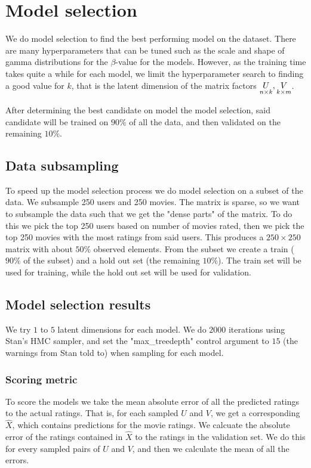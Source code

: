 \documentclass[12pt]{article}
\begin{document}
\section{Model selection}
We do model selection to find the best performing model on the dataset. There are many hyperparameters that can be tuned such as the scale and shape of gamma distributions for the $\beta$-value for the models. However, as the training time takes quite a while for each model, we limit the hyperparameter search to finding a good value for $k$, that is the latent dimension of the matrix factors $\underset{n \times k}{U}, \underset{k \times m}{V}$. 

After determining the best candidate on model the model selection, said candidate will be trained on $90\%$ of all the data, and then validated on the remaining $10\%$.

    \subsection{Data subsampling}
    To speed up the model selection process we do model selection on a subset of the data. We subsample 250 users and 250 movies. The matrix is sparse, so we want to subsample the data such that we get the "dense parts" of the matrix. To do this we pick the top 250 users based on number of movies rated, then we pick the top 250 movies with the most ratings from said users. This produces a $250 \times 250$ matrix with about $50\%$ observed elements. From the subset we create a train ($90\%$ of the subset) and a hold out set (the remaining $10\%$). The train set will be used for training, while the hold out set will be used for validation.

    \subsection{Model selection results}
    We try $1$ to $5$ latent dimensions for each model. We do $2000$ iterations using Stan's HMC sampler, and set the "max\_treedepth" control argument to $15$ (the warnings from Stan told to) when sampling for each model.

        \subsubsection*{Scoring metric}
        To score the models we take the mean absolute error of all the predicted ratings to the actual ratings. That is, for each sampled $U$ and $V$, we get a corresponding $\hat{X}$, which contains predictions for the movie ratings. We calcuate the absolute error of the ratings contained in $\hat{X}$ to the ratings in the validation set. We do this for every sampled pairs of $U$ and $V$, and then we calculate the mean of all the errors. 
\end{document}
